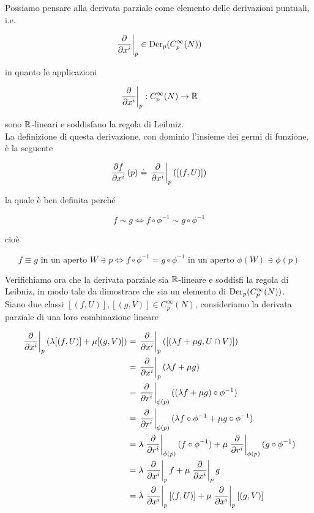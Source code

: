 Possiamo pensare alla derivata parziale come elemento delle derivazioni puntuali, i.e.

\begin{equation}
	\eval{ \pdv{x^{i}} }_{p} \in \der_{p}(C_{p}^{\infty}(N))
\end{equation}

in quanto le applicazioni

\begin{equation}
	\eval{ \pdv{x^{i}} }_{p} : C_{p}^{\infty}(N) \to \R
\end{equation}

sono $ \mathbb{R} $-lineari e soddisfano la regola di Leibniz.\\
La definizione di questa derivazione, con dominio l'insieme dei germi di funzione, è la seguente

\begin{equation}
	\pdv{f}{x^{i}} \, (p) \doteq \eval{ \pdv{x^{i}} }_{p} ([(f,U)])
\end{equation}

la quale è ben definita perché

\begin{equation}
	f \sim g \iff f \circ \phi^{-1} \sim g \circ \phi^{-1}
\end{equation}

cioè

\begin{equation}
	 f \equiv g \text{ in un aperto } W \ni p \iff f \circ \phi^{-1} = g \circ \phi^{-1} \text{ in un aperto } \phi(W) \ni \phi(p)
\end{equation}

Verifichiamo ora che la derivata parziale sia $ \mathbb{R} $-lineare e soddisfi la regola di Leibniz, in modo tale da dimostrare che sia un elemento di $ \operatorname{Der}_{p}(C_{p}^{\infty}(N)) $.\\
Siano due classi $ [(f,U)],[(g,V)] \in C_{p}^{\infty}(N) $, consideriamo la derivata parziale di una loro combinazione lineare

\begin{align}
	\begin{split}
		\eval{ \pdv{x^{i}} }_{p} (\lambda [(f,U)] + \mu [(g,V)]) &= \eval{ \pdv{x^{i}} }_{p} ([(\lambda f + \mu g, U \cap V)])\\
		&= \eval{ \pdv{x^{i}} }_{p} (\lambda f + \mu g)\\
		&= \eval{ \pdv{r^{i}} }_{\phi(p)} ((\lambda f + \mu g) \circ \phi^{-1})\\
		&= \eval{ \pdv{r^{i}} }_{\phi(p)} (\lambda f \circ \phi^{-1} + \mu g \circ \phi^{-1})\\
		&= \lambda \eval{ \pdv{r^{i}} }_{\phi(p)} (f \circ \phi^{-1}) + \mu \eval{ \pdv{r^{i}} }_{\phi(p)} (g \circ \phi^{-1})\\
		&= \lambda \eval{ \pdv{x^{i}} }_{p} f + \mu \eval{ \pdv{x^{i}} }_{p} g\\
		&= \lambda \eval{ \pdv{x^{i}} }_{p} [(f,U)] + \mu \eval{ \pdv{x^{i}} }_{p} [(g,V)]
	\end{split}
\end{align}

